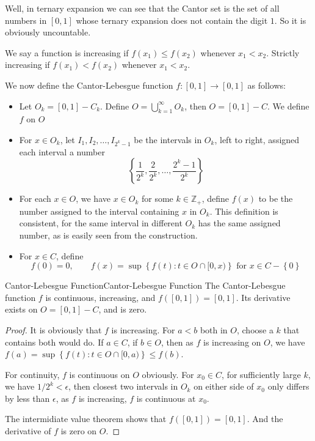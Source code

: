 \documentclass[../main.tex]{subfiles}
\begin{document}
\begin{remark}
	Well, in ternary expansion we can see that the Cantor set is the set of all numbers in $[0,1]$ whose ternary expansion does not contain the digit $1$. So it is obviously uncountable.
\end{remark}

We say a function is increasing if $f(x_1) \leq f(x_2)$ whenever $x_1 < x_2$. Strictly increasing if $f(x_1) < f(x_2)$ whenever $x_1 < x_2$.

We now define the Cantor-Lebesgue function $f: [0,1] \rightarrow [0,1]$ as follows:
\begin{itemize}
	\item Let $O_k = [0,1]-C_k$. Define $O = \bigcup_{k=1}^{\infty } O_k$, then $O = [0,1]-C$. We define $f$ on $O$
	\item For $x\in O_k$, let $I_1,I_2,\ldots ,I_{2^k-1}$ be the intervals in $O_k$, left to right, assigned each interval a number
		\begin{equation*}
			\left\{ \frac{1}{2^k}, \frac{2}{2^k}, \ldots ,\frac{2^k-1}{2^k} \right\}
		\end{equation*}
	\item For each $x\in O$, we have $x\in O_k$ for some $k\in \mathbb{Z}_+$, define $f(x)$ to be the number assigned to the interval containing $x$ in $O_k$. This definition is consistent, for the same interval in different $O_k$ has the same assigned number, as is easily seen from the construction.
	\item For $x\in C$, define
		\begin{equation*}
		f(0)=0, \qquad f(x) = \sup \left\{ f(t) : t\in O\cap [0,x) \right\} \text{ for }x\in C-\left\{ 0 \right\}
		\end{equation*}
\end{itemize}

\begin{proposition}{Cantor-Lebesgue Function}{Cantor-Lebesgue Function}
	The Cantor-Lebesgue function $f$ is continuous, increasing, and $f([0,1]) = [0,1]$. Its derivative exists on $O = [0,1]-C$, and is zero.
\end{proposition}
\begin{proof}
	It is obviously that $f$ is increasing. For $a<b$ both in $O$, choose a $k$ that contains both would do. If $a\in C$, if $b\in O$, then as $f$ is increasing on $O$, we have $f(a) = \sup \left\{ f(t) : t\in O\cap [0,a) \right\} \leq f(b)$.

	For continuity, $f$ is continuous on $O$ obviously. For $x_0\in C$, for sufficiently large $k$, we have $1 / 2^k < \epsilon$, then closest two intervals in $O_k$ on either side of $x_0$ only differs by less than $\epsilon$, as $f$ is increasing, $f$ is continuous at $x_0$.

	The intermidiate value theorem shows that $f([0,1]) = [0,1]$. And the derivative of $f$ is zero on $O$.
\end{proof}
\end{document}
